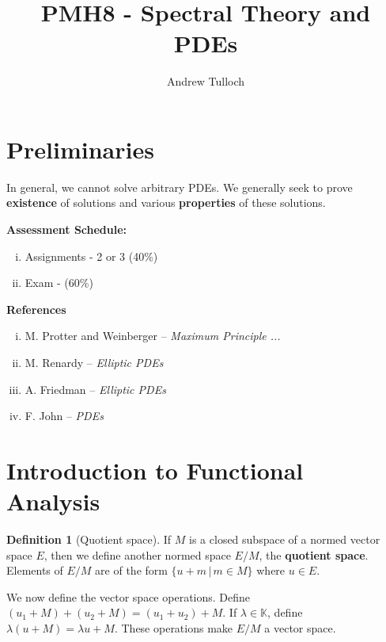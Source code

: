 \documentclass[10pt, oneside, reqno]{amsart}
\title{PMH8 - Spectral Theory and PDEs}                             %
\author{Andrew Tulloch}
\theoremstyle{plain}%
\numberwithin{equation}{section}
\theoremstyle{definition}
\newtheorem{defn}[thm]{Definition}
\theoremstyle{remark}
\newcommand{\given}{ \, | \,}
\newcommand{\K}{\mathbb{K}}
\begin{document}
\maketitle \tableofcontents \clearpage


\section{Preliminaries} %
\label{sec:preliminaries}


In general, we cannot solve arbitrary PDEs.  We generally seek to prove \textbf{existence} of solutions and various \textbf{properties} of these solutions.  


\textbf{Assessment Schedule:}
\begin{enumerate}[(i)]
    \item Assignments - 2 or 3 (40\%)
    \item Exam - (60\%) 
\end{enumerate}

\textbf{References}
\begin{enumerate}[(i)]
    \item M. Protter and Weinberger -- \emph{Maximum Principle ...}
    \item M. Renardy -- \emph{Elliptic PDEs}
    \item A. Friedman -- \emph{Elliptic PDEs}
    \item F. John -- \emph{PDEs}
\end{enumerate}

\section{Introduction to Functional Analysis} %
\label{sec:introduction_to_functional_analysis_}

\begin{defn}[Quotient space]
    If $M$ is a closed subspace of a normed vector space $E$, then we define another normed space $E / M$, the \textbf{quotient space}.  Elements of $E / M$ are of the form  $\{ u + m \given m \in M \}$ where $u \in E$. 

    We now define the vector space operations.  Define $(u_1 + M) + (u_2 + M) = (u_1 + u_2) + M$.  If $\lambda \in \K$, define $\lambda(u + M) = \lambda u + M$.  These operations make $E/M$ a vector space.
\end{defn}
\end{document}
